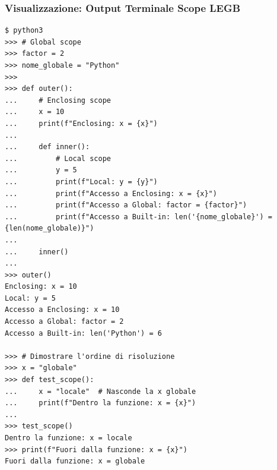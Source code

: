 \subsubsection{Visualizzazione: Output Terminale Scope LEGB}
\label{subsubsec:fun-scope-terminal}
\begin{tcolorbox}[title=Dimostrazione Scope LEGB nel Terminale, colback=black!5, colframe=blue!50!black]
\begin{lstlisting}[style=python]
$ python3
>>> # Global scope
>>> factor = 2
>>> nome_globale = "Python"
>>>
>>> def outer():
...     # Enclosing scope
...     x = 10
...     print(f"Enclosing: x = {x}")
...
...     def inner():
...         # Local scope
...         y = 5
...         print(f"Local: y = {y}")
...         print(f"Accesso a Enclosing: x = {x}")
...         print(f"Accesso a Global: factor = {factor}")
...         print(f"Accesso a Built-in: len('{nome_globale}') = {len(nome_globale)}")
...
...     inner()
...
>>> outer()
Enclosing: x = 10
Local: y = 5
Accesso a Enclosing: x = 10
Accesso a Global: factor = 2
Accesso a Built-in: len('Python') = 6

>>> # Dimostrare l'ordine di risoluzione
>>> x = "globale"
>>> def test_scope():
...     x = "locale"  # Nasconde la x globale
...     print(f"Dentro la funzione: x = {x}")
...
>>> test_scope()
Dentro la funzione: x = locale
>>> print(f"Fuori dalla funzione: x = {x}")
Fuori dalla funzione: x = globale
\end{lstlisting}
\end{tcolorbox}
